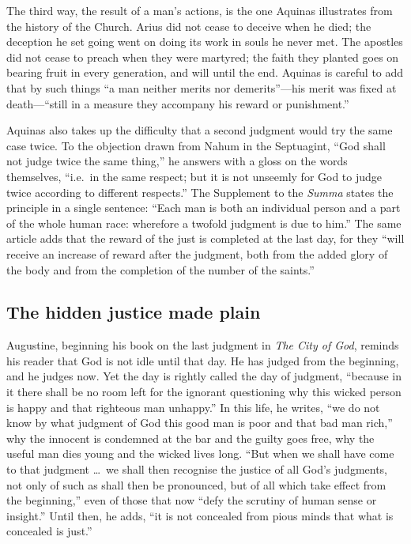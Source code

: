 The third way, the result of a man's actions, is the one Aquinas illustrates from the history of the Church. Arius did not cease to deceive when he died; the deception he set going went on doing its work in souls he never met. The apostles did not cease to preach when they were martyred; the faith they planted goes on bearing fruit in every generation, and will until the end. Aquinas is careful to add that by such things ``a man neither merits nor demerits''---his merit was fixed at death---``still in a measure they accompany his reward or punishment.''

Aquinas also takes up the difficulty that a second judgment would try the same case twice. To the objection drawn from Nahum in the Septuagint, ``God shall not judge twice the same thing,'' he answers with a gloss on the words themselves, ``i.e.\ in the same respect; but it is not unseemly for God to judge twice according to different respects.'' The Supplement to the \emph{Summa} states the principle in a single sentence: ``Each man is both an individual person and a part of the whole human race: wherefore a twofold judgment is due to him.'' The same article adds that the reward of the just is completed at the last day, for they ``will receive an increase of reward after the judgment, both from the added glory of the body and from the completion of the number of the saints.''

\subsection{The hidden justice made plain}

Augustine, beginning his book on the last judgment in \emph{The City of God}, reminds his reader that God is not idle until that day. He has judged from the beginning, and he judges now. Yet the day is rightly called the day of judgment, ``because in it there shall be no room left for the ignorant questioning why this wicked person is happy and that righteous man unhappy.'' In this life, he writes, ``we do not know by what judgment of God this good man is poor and that bad man rich,'' why the innocent is condemned at the bar and the guilty goes free, why the useful man dies young and the wicked lives long. ``But when we shall have come to that judgment \ldots\ we shall then recognise the justice of all God's judgments, not only of such as shall then be pronounced, but of all which take effect from the beginning,'' even of those that now ``defy the scrutiny of human sense or insight.'' Until then, he adds, ``it is not concealed from pious minds that what is concealed is just.''

